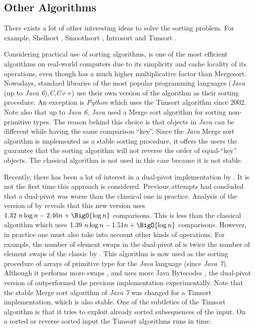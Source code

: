 \subsection*{Other Algorithms}

There exists a lot of other interesting ideas to solve the sorting problem. For
example, Shellsort \cite{shell:1959}, Smoothsort \cite{dijkstra:1982},
Introsort \cite{musser:1997} and Timsort \cite{martelli:2006}.

Considering practical use of sorting algorithms, \quicksort is one of the most
efficient algorithms on real-world computers due to its simplicity and cache
locality of its operations, even though \quicksort has a much higher
multiplicative factor than Mergesort. Nowadays, standard libraries of the most
popular programming languages (\emph{Java} (up to \emph{Java
6}),\emph{C},\emph{C++}) use their own version of the \quicksort algorithm as
their sorting procedure. An exception is \emph{Python} which uses the Timsort
algorithm since 2002. Note also that up to \emph{Java 6}, \emph{Java} used a
Merge sort algorithm for sorting non-primitive types. The reason behind this
choice is that objects in \emph{Java} can be different while having the same
comparison ``key''. Since the \emph{Java} Merge sort algorithm is implemented as
a stable sorting procedure, it offers the users the guarantee that the sorting
algorithm will not reverse the order of equal-``key'' objects. The classical
\quicksort algorithm is not used in this case because it is not stable.

Recently, there has been a lot of interest in a dual-pivot \quicksort
implementation by \citet*{yaroslavskiy:2009}. It is not the first time this
approach is considered. Previous attempts \cite{sedgewick:1980} had concluded
that a dual-pivot \quicksort was worse than the classical one in practice.
Analysis of the version of \citet*{yaroslavskiy:2009} by \citet*{wild:2012}
reveals that this new version uses \(1.32~n \log n - 2.46n + \BigO{\log n}\)
comparisons.  This is less than the classical \quicksort algorithm which uses
\(1.39~n \log n
- 1.51n + \BigO{\log n}\) comparisons. However, in practice one must also take into account
  other kinds of operations. For example, the number of element swaps in the
dual-pivot \quicksort of \citeauthor{yaroslavskiy:2009} is twice the number of
element swaps of the classic \quicksort by \citeauthor{hoare:1962}. This
algorithm is now used as the sorting procedure of arrays of primitive type for
the \emph{Java} language (since \emph{Java 7}). Although it performs more
swaps \cite{wild:2012}, and uses more Java Bytecodes \cite{wild:2013}, the
dual-pivot version of \citet*{yaroslavskiy:2009} outperformed the previous
\quicksort implementation experimentally. Note that the stable Merge sort
algorithm of \emph{Java 7} was changed for a Timsort implementation, which is
also stable. One of the subtleties of the Timsort algorithm is that it tries
to exploit already sorted subsequences of the input. On a sorted or reverse
sorted input the Timsort algorithms runs in  time.

